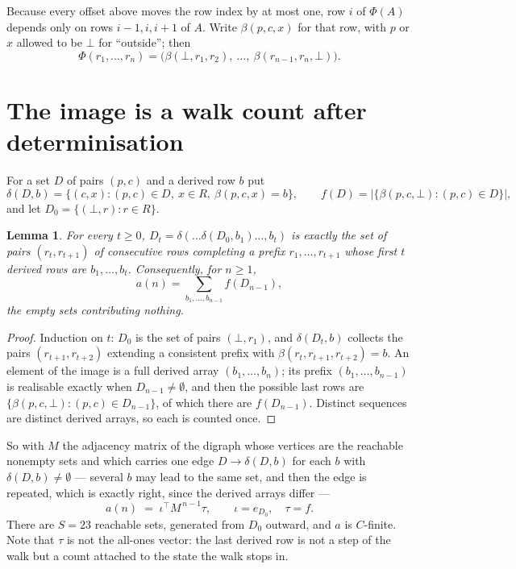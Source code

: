 \documentclass[11pt,a4paper]{article}
\theoremstyle{plain}
\newtheorem{lemma}[theorem]{Lemma}
\theoremstyle{definition}
\begin{document}
Because every offset above moves the row index by at most one, row $i$ of
$\Phi(A)$ depends only on rows $i-1,i,i+1$ of $A$. Write $\beta(p,c,x)$ for that row, with $p$
or $x$ allowed to be $\bot$ for ``outside''; then
\[
\Phi(r_1,\dots,r_n)=\bigl(\beta(\bot,r_1,r_2),\ \dots,\ \beta(r_{n-1},r_n,\bot)\bigr).
\]

\section{The image is a walk count after determinisation}

For a set $D$ of pairs $(p,c)$ and a derived row $b$ put
\[
\delta(D,b)=\{(c,x):(p,c)\in D,\ x\in R,\ \beta(p,c,x)=b\},\qquad
f(D)=\bigl|\{\beta(p,c,\bot):(p,c)\in D\}\bigr| ,
\]
and let $D_0=\{(\bot,r):r\in R\}$.

\begin{lemma}\label{lem:det}
For every $t\ge0$, $D_t=\delta(\dots\delta(D_0,b_1)\dots,b_t)$ is exactly the set of pairs
$(r_t,r_{t+1})$ of consecutive rows completing a prefix $r_1,\dots,r_{t+1}$ whose first $t$
derived rows are $b_1,\dots,b_t$. Consequently, for $n\ge1$,
\[
a(n)=\sum_{b_1,\dots,b_{n-1}}f(D_{n-1}),
\]
the empty sets contributing nothing.
\end{lemma}

\begin{proof}
Induction on $t$: $D_0$ is the set of pairs $(\bot,r_1)$, and $\delta(D_t,b)$ collects the
pairs $(r_{t+1},r_{t+2})$ extending a consistent prefix with
$\beta(r_t,r_{t+1},r_{t+2})=b$. An element of the image is a full derived array
$(b_1,\dots,b_n)$; its prefix $(b_1,\dots,b_{n-1})$ is realisable exactly when
$D_{n-1}\neq\emptyset$, and then the possible last rows are
$\{\beta(p,c,\bot):(p,c)\in D_{n-1}\}$, of which there are $f(D_{n-1})$. Distinct sequences
are distinct derived arrays, so each is counted once.
\end{proof}

So with $M$ the adjacency matrix of the digraph whose vertices are the reachable nonempty sets
and which carries one edge $D\to\delta(D,b)$ for each $b$ with $\delta(D,b)\neq\emptyset$ ---
several $b$ may lead to the same set, and then the edge is repeated, which is exactly right,
since the derived arrays differ ---
\[
a(n)\;=\;\iota^{\!\top}M^{\,n-1}\tau,\qquad \iota=e_{D_0},\quad \tau=f .
\]
There are $S=23$ reachable sets, generated from $D_0$ outward, and $a$ is $C$-finite.
Note that $\tau$ is not the all-ones vector: the last derived row is not a
step of the walk but a count attached to the state the walk stops in.
\end{document}
